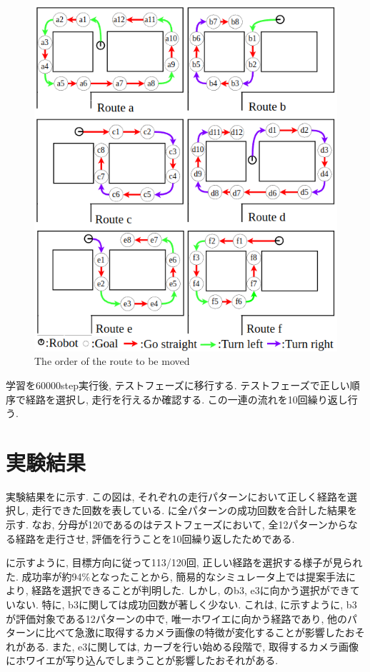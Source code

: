 \begin{figure}[hbtp]
  \centering
 \includegraphics[keepaspectratio, scale=0.6]
      {images/route.png}
 \caption{The order of the route to be moved}
 \label{Fig:route}
\end{figure}

 学習を60000step実行後, テストフェーズに移行する. テストフェーズで正しい順序で経路を選択し, 走行を行えるか確認する. この一連の流れを10回繰り返し行う.


  \section{実験結果}
  実験結果をに示す. この図は, それぞれの走行パターンにおいて正しく経路を選択し, 走行できた回数を表している. に全パターンの成功回数を合計した結果を示す. なお, 分母が120であるのはテストフェーズにおいて, 全12パターンからなる経路を走行させ, 評価を行うことを10回繰り返したためである. 
  \par
  に示すように, 目標方向に従って113/120回, 正しい経路を選択する様子が見られた. 成功率が約94\%となったことから, 簡易的なシミュレータ上では提案手法により, 経路を選択できることが判明した. しかし, のb3, e3に向かう選択ができていない. 特に, b3に関しては成功回数が著しく少ない. これは, に示すように, b3が評価対象である12パターンの中で, 唯一ホワイエに向かう経路であり, 他のパターンに比べて急激に取得するカメラ画像の特徴が変化することが影響したおそれがある. 
  また, e3に関しては, カーブを行い始める段階で, 取得するカメラ画像にホワイエが写り込んでしまうことが影響したおそれがある.

